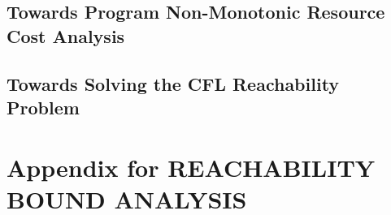 \documentclass[12pt, letterpaper]{report}   %
\begin{document}
\section{Towards Program Non-Monotonic Resource Cost Analysis}
\label{sec:future-cost}


\section{Towards Solving the CFL Reachability Problem}
\label{sec:future-cfl}



\cleardoublepage


\nocite{tikzDevice,plotly,reshape,Rcomputing,Florida2000}



\chapter*{}
\appendix
\begingroup
  \hypersetup{linkbordercolor=white,linkcolor=black,
    filecolor=black, urlcolor=black} 
\listofappendixfigures
\endgroup
%
\chapter{Appendix for REACHABILITY BOUND ANALYSIS}
\label{apdx:reachability}

\end{document}
